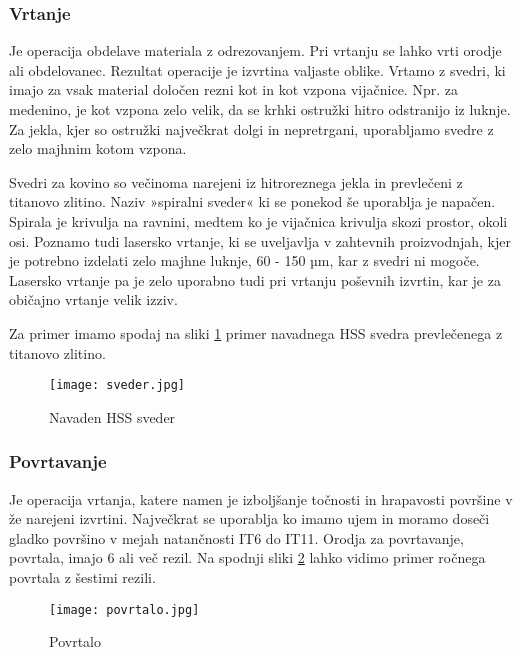 \newpage
\subsubsection{Vrtanje}
Je operacija obdelave materiala z odrezovanjem. 
Pri vrtanju se lahko vrti orodje ali obdelovanec. Rezultat 
operacije je izvrtina valjaste oblike. Vrtamo z svedri, 
ki imajo za vsak material določen rezni kot in kot vzpona 
vijačnice. Npr. za medenino, je kot vzpona zelo velik, da se 
krhki ostružki hitro odstranijo iz luknje. Za jekla, kjer so 
ostružki največkrat dolgi in nepretrgani, uporabljamo svedre z 
zelo majhnim kotom vzpona.

Svedri za kovino so večinoma narejeni iz hitroreznega jekla in 
prevlečeni z titanovo zlitino.
Naziv »spiralni sveder« ki se ponekod še uporablja je napačen. 
Spirala je krivulja na ravnini, medtem ko je vijačnica krivulja 
skozi prostor, okoli osi.
Poznamo tudi lasersko vrtanje, ki se uveljavlja v zahtevnih 
proizvodnjah, kjer je potrebno izdelati zelo majhne luknje, 
60 - 150 µm, kar z svedri ni mogoče. Lasersko vrtanje pa je zelo 
uporabno tudi pri vrtanju poševnih izvrtin, kar je za običajno 
vrtanje velik izziv.

Za primer imamo spodaj na sliki \ref{hss_sveder} primer navadnega
HSS svedra prevlečenega z titanovo zlitino.
\begin{figure}[H]
    \begin{center}
        \texttt{[image: sveder.jpg]}
        \caption{Navaden HSS sveder
        \cite{sveder}}
        \label{hss_sveder}
    \end{center}
\end{figure}

\newpage
\subsubsection{Povrtavanje}
Je operacija vrtanja, katere namen je izboljšanje točnosti in 
hrapavosti površine v že narejeni izvrtini. Največkrat se 
uporablja ko imamo ujem in moramo doseči gladko površino v 
mejah natančnosti IT6 do IT11. Orodja za povrtavanje, povrtala, 
imajo 6 ali več rezil. Na spodnji sliki \ref{povrtalo} lahko vidimo
primer ročnega povrtala z šestimi rezili.

\begin{figure}[H]
    \begin{center}
        \texttt{[image: povrtalo.jpg]}
        \caption{Povrtalo
        \cite{sts_arhiv}}
        \label{povrtalo}
    \end{center}
\end{figure}

